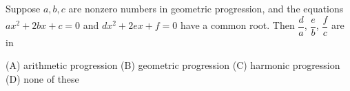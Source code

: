 Suppose $a,b,c$ are nonzero numbers in geometric progression, and the equations $ax^2+2bx+c=0$ and $dx^2+2ex+f=0$ have a common root. Then $\dfrac {d}{a}$, $\dfrac {e}{b}$, $\dfrac {f}{c}$ are in

(A) arithmetic progression \quad (B) geometric progression \quad (C) harmonic progression \quad (D) none of these
